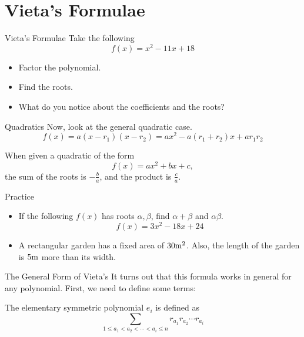 \documentclass[aspectratio=169,xcolor=dvipsnames]{beamer}
\begin{document}
\section{Vieta's Formulae}

\begin{frame}[t]{Vieta's Formulae}
    Take the following
    \[
    f(x)=x^2-11x+18
    \]
    
    \begin{itemize}
        \item Factor the polynomial.
        \item Find the roots.
        \item What do you notice about the coefficients and the roots?
    \end{itemize}
\end{frame}

\begin{frame}[t]{Quadratics}
    Now, look at the general quadratic case.
    \[
    f(x)=a(x-r_1)(x-r_2)=ax^2-a(r_1+r_2)x+ar_1r_2
    \]
    
    \begin{theorem}
        When given a quadratic of the form
        \[f(x)=ax^2+bx+c,\]
        the sum of the roots is $-\frac ba$, and the product is $\frac ca$.
    \end{theorem}
\end{frame}

\begin{frame}[t]{Practice}
    \begin{itemize}
        \item If the following \(f(x)\) has roots \(\alpha, \beta\), find \(\alpha+\beta\) and \(\alpha\beta\).
        \[f(x)=3x^2-18x+24\]
        \item A rectangular garden has a fixed area of \(30 \rm m^2\). Also, the length of the garden is \(5 \rm m\) more than its width. 
    \end{itemize}
\end{frame}

\begin{frame}[t]{The General Form of Vieta's}
    It turns out that this formula works in general for any polynomial. First, we need to define some terms:
    \begin{definition}
        The elementary symmetric polynomial $e_i$ is defined as
        \[\sum_{1\le a_1<a_2<\cdots<a_i\le n}r_{a_1}r_{a_2}\cdots r_{a_i}\]     
        
    \end{definition}
\end{frame}
\end{document}
